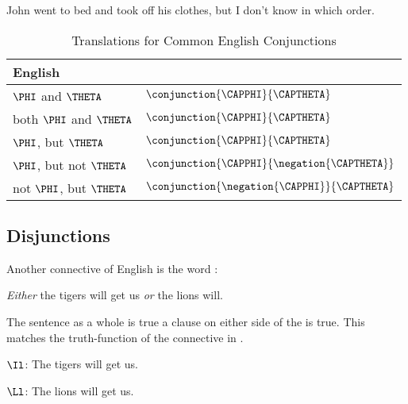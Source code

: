 \begin{menumerate}
	\item John went to bed and took off his clothes, but I don't know in which order.
\end{menumerate}

\begin{table}
	\renewcommand{\arraystretch}{1.5}%
	\begin{center}
		\begin{tabular}{ l l } %
			\toprule
			\textbf{English} & \textbf{\GSL{}} \\ 
			\midrule
			$\PHI$ and $\THETA$ & $\conjunction{\CAPPHI}{\CAPTHETA}$ \\
			both $\PHI$ and $\THETA$ & $\conjunction{\CAPPHI}{\CAPTHETA}$ \\
			$\PHI$, but $\THETA$ & $\conjunction{\CAPPHI}{\CAPTHETA}$ \\
			$\PHI$, but not $\THETA$ & $\conjunction{\CAPPHI}{\negation{\CAPTHETA}}$ \\
			not $\PHI$, but $\THETA$ & $\conjunction{\negation{\CAPPHI}}{\CAPTHETA}$ \\
			\bottomrule
		\end{tabular} 
		\caption{Translations for Common English Conjunctions}
		\label{TransTableD} 
	\end{center}
\end{table}

\subsection{Disjunctions}\label{Translating GSLDisjunctions}

Another connective of English is the word :

\begin{menumerate}
	\item \emph{Either} the tigers will get us \emph{or} the lions will.
\end{menumerate}

\noindent{}The sentence as a whole is true \Iff a clause on either side of the  is true.
This matches the truth-function of the \mention{$\VEE$} connective in \GSL{}.

\begin{description}[itemsep=0em]
	\item[Translation Key:] \hfill{} 
	\begin{description}[itemsep=0em]
		\item $\Il$: The tigers will get us.
		\item $\Ll$: The lions will get us.
	\end{description} 
\end{description}


